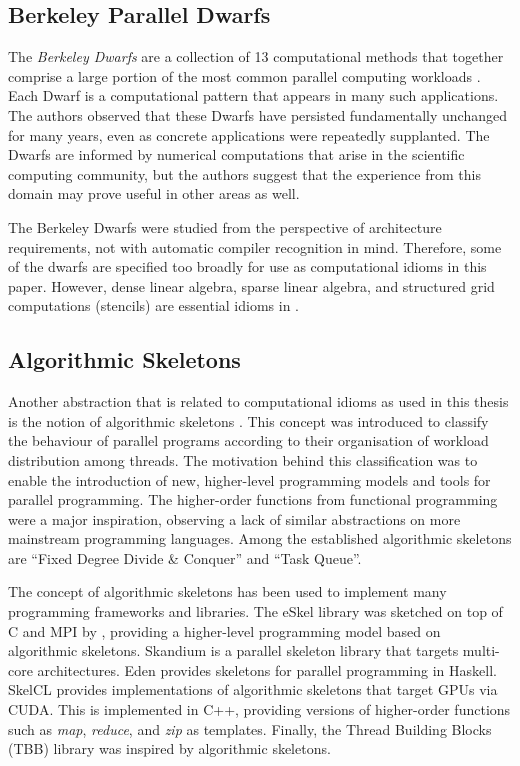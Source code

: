 \subsection{Berkeley Parallel Dwarfs}

    The {\it Berkeley Dwarfs} are a collection of 13 computational methods
    that together comprise a large portion of the most common parallel computing
    workloads \citep{Asanovic06thelandscape}.
    Each Dwarf is a computational pattern that appears in many such
    applications.
    The authors observed that these Dwarfs have persisted fundamentally
    unchanged for many years, even as concrete applications were repeatedly
    supplanted.
    The Dwarfs are informed by numerical computations that arise in the
    scientific computing community, but the authors suggest that the
    experience from this domain may prove useful in other areas as well.

    The Berkeley Dwarfs were studied from the perspective of architecture
    requirements, not with automatic compiler recognition in mind.
    Therefore, some of the dwarfs are specified too broadly for use as
    computational idioms in this paper.
    However, dense linear algebra, sparse linear algebra, and structured grid
    computations (stencils) are essential idioms in .

\subsection{Algorithmic Skeletons}

    Another abstraction that is related to computational idioms as used in this
    thesis is the notion of algorithmic skeletons \citep{Cole1991Algorithmic}.
    This concept was introduced to classify the behaviour of parallel programs
    according to their organisation of workload distribution among threads.
    The motivation behind this classification was to enable the introduction of
    new, higher-level programming models and tools for parallel programming.
    The higher-order functions from functional programming were a major
    inspiration, observing a lack of similar abstractions on more mainstream
    programming languages.
    Among the established algorithmic skeletons are
    ``Fixed Degree Divide \& Conquer'' and ``Task Queue''.

    The concept of algorithmic skeletons has been used to implement many
    programming frameworks and libraries.
    The eSkel library was sketched on top of C and MPI by
    \citet{Cole2004Bringing}, providing a higher-level programming model based
    on algorithmic skeletons.
    Skandium \citep{Leyton2010Skandium} is a parallel skeleton library that
    targets multi-core architectures.
    Eden \citep{Loogen2005Parallel} provides skeletons for parallel programming
    in Haskell.
    SkelCL \citep{Steuwer2011SkelCL} provides implementations of algorithmic
    skeletons that target GPUs via CUDA.
    This is implemented in C++, providing versions of higher-order functions
    such as {\it map}, {\it reduce}, and {\it zip} as templates.
    Finally, the Thread Building Blocks (TBB) library
    \citep{Reinders2007Intel} was inspired by algorithmic skeletons.

